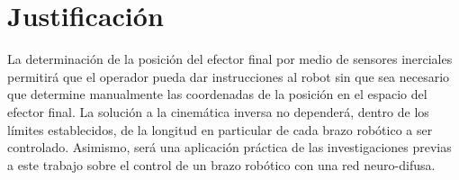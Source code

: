 \section{Justificación}

La determinación de la posición del efector final por medio de sensores inerciales permitirá que el operador pueda dar instrucciones al robot sin que sea necesario que determine manualmente las coordenadas de la posición en el espacio del efector final. La solución a la cinemática inversa no dependerá, dentro de los límites establecidos, de la longitud en particular de cada brazo robótico a ser controlado. Asimismo, será una aplicación práctica de las investigaciones previas a este trabajo sobre el control de un brazo robótico con una red neuro-difusa.